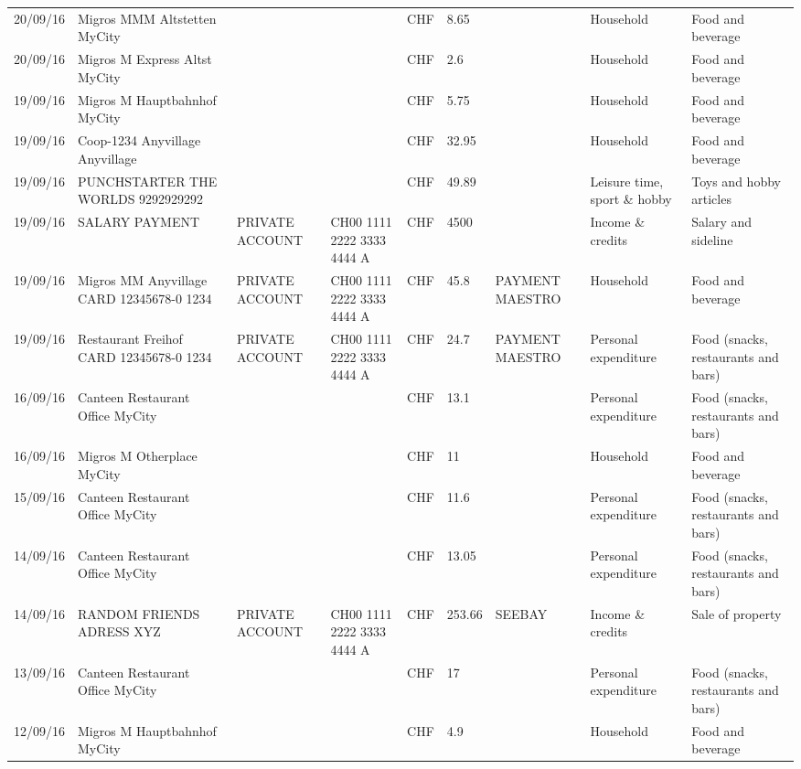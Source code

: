\begin{landscape}
\begin{table}[t]
\begin{center}
\begin{tabular}{lllllllll}
		20/09/16 & Migros MMM Altstetten    MyCity &       &       & CHF   & 8.65  &       & Household & Food and beverage \\
		20/09/16 & Migros M Express Altst   MyCity &       &       & CHF   & 2.6   &       & Household & Food and beverage \\
		19/09/16 & Migros M Hauptbahnhof    MyCity &       &       & CHF   & 5.75  &       & Household & Food and beverage \\
		19/09/16 & Coop-1234 Anyvillage    Anyvillage &       &       & CHF   & 32.95 &       & Household & Food and beverage \\
		19/09/16 & PUNCHSTARTER THE WORLDS   9292929292 &       &       & CHF   & 49.89 &       & Leisure time, sport \& hobby & Toys and hobby articles \\
		19/09/16 & SALARY PAYMENT & PRIVATE ACCOUNT & CH00 1111 2222 3333 4444 A & CHF   & 4500  &       & Income \& credits & Salary and sideline \\
		19/09/16 & Migros MM Anyvillage CARD 12345678-0 1234 & PRIVATE ACCOUNT & CH00 1111 2222 3333 4444 A & CHF   & 45.8  & PAYMENT MAESTRO & Household & Food and beverage \\
		19/09/16 & Restaurant Freihof CARD 12345678-0 1234 & PRIVATE ACCOUNT & CH00 1111 2222 3333 4444 A & CHF   & 24.7  & PAYMENT MAESTRO & Personal expenditure & Food (snacks, restaurants and bars) \\
		16/09/16 & Canteen Restaurant Office      MyCity &       &       & CHF   & 13.1  &       & Personal expenditure & Food (snacks, restaurants and bars) \\
		16/09/16 & Migros M Otherplace   MyCity &       &       & CHF   & 11    &       & Household & Food and beverage \\
		15/09/16 & Canteen Restaurant Office      MyCity &       &       & CHF   & 11.6  &       & Personal expenditure & Food (snacks, restaurants and bars) \\
		14/09/16 & Canteen Restaurant Office      MyCity &       &       & CHF   & 13.05 &       & Personal expenditure & Food (snacks, restaurants and bars) \\
		14/09/16 & RANDOM FRIENDS ADRESS XYZ & PRIVATE ACCOUNT & CH00 1111 2222 3333 4444 A & CHF   & 253.66 & SEEBAY & Income \& credits & Sale of property \\
		13/09/16 & Canteen Restaurant Office      MyCity &       &       & CHF   & 17    &       & Personal expenditure & Food (snacks, restaurants and bars) \\
		12/09/16 & Migros M Hauptbahnhof    MyCity &       &       & CHF   & 4.9   &       & Household & Food and beverage \\

\end{tabular}
\end{center}
\end{table}
\end{landscape}
